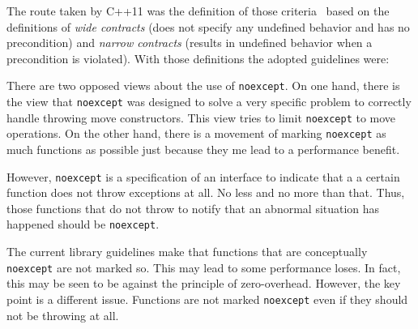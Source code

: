 The route taken by C++11 was the definition of those criteria~\cite{n3279} based
on the definitions of \emph{wide contracts} (does not specify any undefined behavior
and has no precondition) and \emph{narrow contracts} (results in undefined
behavior when a precondition is violated). With those definitions the adopted guidelines
were:

\vspace{1em}
\vspace{1em}

There are two opposed views about the use of \texttt{noexcept}. On one hand,
there is the view that \texttt{noexcept} was designed to solve a very specific
problem to correctly handle throwing move constructors. This view tries to
limit \texttt{noexcept} to move operations. On the other hand, there is a
movement of marking \texttt{noexcept} as much functions as possible just
because they me lead to a performance benefit.

However, \texttt{noexcept} is a specification of an interface to indicate that a
a certain function does not throw exceptions at all. No less and no more than
that. Thus, those functions that do not throw to notify that an abnormal
situation has happened should be \texttt{noexcept}.

The current library guidelines make that functions that are conceptually
\texttt{noexcept} are not marked so. This may lead to some performance loses.
In fact, this may be seen to be against the principle of zero-overhead. However,
the key point is a different issue. Functions are not marked \texttt{noexcept}
even if they should not be throwing at all.
